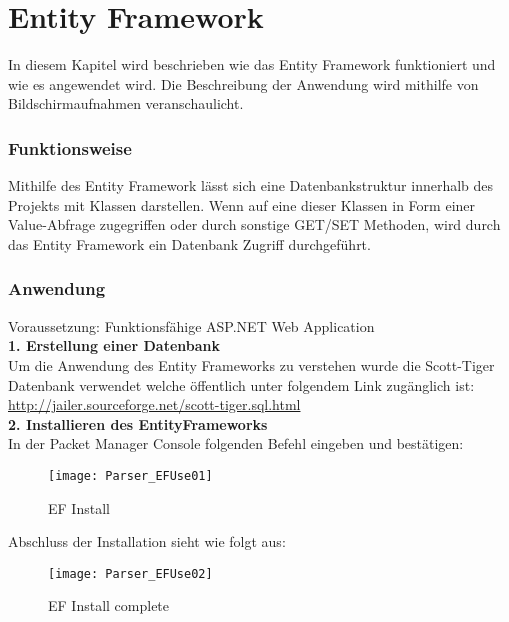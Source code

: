 \section{Entity Framework}
\label{sec:parser-entity-framework}
In diesem Kapitel wird beschrieben wie das Entity Framework funktioniert und wie es angewendet wird. Die  Beschreibung der Anwendung wird mithilfe von Bildschirmaufnahmen veranschaulicht. 
\subsubsection {Funktionsweise}
Mithilfe des Entity Framework lässt sich eine Datenbankstruktur innerhalb des Projekts mit Klassen darstellen. Wenn auf eine dieser Klassen in Form einer Value-Abfrage zugegriffen oder durch sonstige GET/SET Methoden, wird durch das Entity Framework ein Datenbank Zugriff durchgeführt. 
\subsubsection {Anwendung}
Voraussetzung: Funktionsfähige ASP.NET Web Application \\
\break \textbf{1. Erstellung einer Datenbank} \\
Um die Anwendung des Entity Frameworks zu verstehen wurde die Scott-Tiger Datenbank verwendet welche öffentlich unter folgendem Link zugänglich ist:  
\break \url{http://jailer.sourceforge.net/scott-tiger.sql.html} \\
\break \textbf{2. Installieren des EntityFrameworks} \\
In der Packet Manager Console folgenden Befehl eingeben und bestätigen: 
\begin{figure}[H]
	\centering
    \texttt{[image: Parser\_EFUse01]}
    \caption{EF Install}
    \label{fig:parsef01}
\end{figure}
Abschluss der Installation sieht wie folgt aus:
\begin{figure}[H]
    \texttt{[image: Parser\_EFUse02]}
    \caption{EF Install complete}
    \label{fig:parsef02}
\end{figure} 

